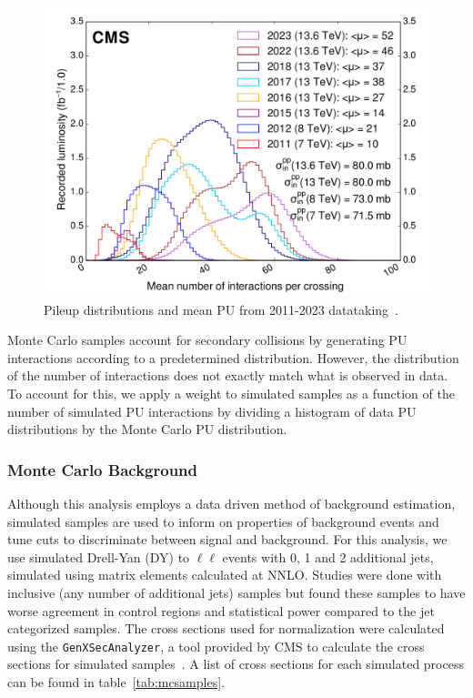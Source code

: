 \begin{figure}[htb!]
	\centering
	\includegraphics[width=0.8\linewidth]{figs/05_analysis/pileup_allYears.pdf}
	\caption[Pileup distributions and mean PU from 2011-2023 datataking~\cite{CMSlumi}.]{Pileup distributions and mean PU from 2011-2023 datataking~\cite{CMSlumi}.}
	\label{fig:pileup}
\end{figure}

Monte Carlo samples account for secondary collisions by generating PU interactions according to a predetermined distribution. However, the distribution of the number of interactions does not exactly match what is observed in data. To account for this, we apply a weight to simulated samples as a function of the number of simulated PU interactions by dividing a histogram of data PU distributions by the Monte Carlo PU distribution.

\subsubsection{Monte Carlo Background} \label{sec:ana_mcbkg}
Although this analysis employs a data driven method of background estimation, simulated samples are used to inform on properties of background events and tune cuts to discriminate between signal and background. For this analysis, we use simulated Drell-Yan (DY) to $\ell\ell$ events with 0, 1 and 2 additional jets, simulated using matrix elements calculated at NNLO. Studies were done with inclusive (any number of additional jets) samples but found these samples to have worse agreement in control regions and statistical power compared to the jet categorized samples. The cross sections used for normalization were calculated using the \texttt{GenXSecAnalyzer}, a tool provided by CMS to calculate the cross sections for simulated samples~\cite{genxsecana}. A list of cross sections for each simulated process can be found in table~\ref{tab:mcsamples}.

